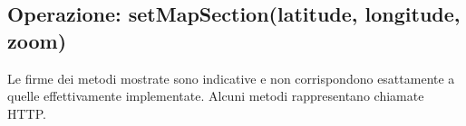 

\subsection{Operazione: setMapSection(latitude, longitude, zoom)}

Le firme dei metodi mostrate sono indicative e non corrispondono esattamente a quelle effettivamente implementate.
Alcuni metodi rappresentano chiamate HTTP.

\vspace{\baselineskip}

